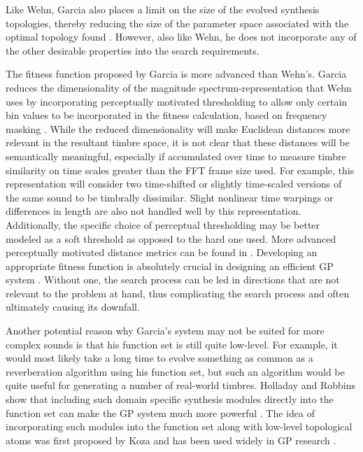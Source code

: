 \documentclass[a4paper,12pt]{report} 	%
\numberwithin{figure}{chapter}
\numberwithin{table}{chapter}
\numberwithin{equation}{chapter}
\begin{document}
\begin{flushleft}
Like Wehn, Garcia also places a limit on the size of the evolved synthesis topologies, thereby reducing the size of the parameter space associated with the optimal topology found \cite[p. 87]{Garcia:2001jw}. However, also like Wehn, he does not incorporate any of the other desirable properties into the search requirements.

The fitness function proposed by Garcia is more advanced than Wehn's. Garcia reduces the dimensionality of the magnitude spectrum-representation that Wehn uses by incorporating perceptually motivated thresholding to allow only certain bin values to be incorporated in the fitness calculation, based on frequency masking \cite[p. 6]{Garcia:2002cq}. While the reduced dimensionality will make Euclidean distances more relevant in the resultant timbre space, it is not clear that these distances will be semantically meaningful, especially if accumulated over time to measure timbre similarity on time scales greater than the FFT frame size used. For example, this representation will consider two time-shifted or slightly time-scaled versions of the same sound to be timbrally dissimilar. Slight nonlinear time warpings or differences in length are also not handled well by this representation. Additionally, the specific choice of perceptual thresholding may be better modeled as a soft threshold as opposed to the hard one used. More advanced perceptually motivated distance metrics can be found in \cite{Riionheimo:2003qo, Jehan:2005fy}. Developing an appropriate fitness function is absolutely crucial in designing an efficient GP system \cite[p. 3]{McDermott:2006ud}. Without one, the search process can be led in directions that are not relevant to the problem at hand, thus complicating the search process and often ultimately causing its downfall.

Another potential reason why Garcia's system may not be suited for more complex sounds is that his function set is still quite low-level. For example, it would most likely take a long time to evolve something as common as a reverberation algorithm using his function set, but such an algorithm would be quite useful for generating a number of real-world timbres. Holladay and Robbins show that including such domain specific synthesis modules directly into the function set can make the GP system much more powerful \cite[p. 4]{Holladay:2007ct}. The idea of incorporating such modules into the function set along with low-level topological atoms was first proposed by Koza and has been used widely in GP research \cite{Koza:1992gp}.


\end{flushleft}
\end{document}
